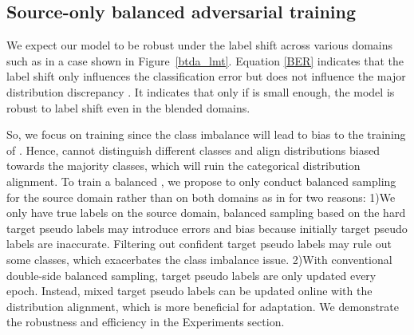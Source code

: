 \documentclass[letterpaper]{article} \usepackage{aaai23}  \usepackage{times}  \usepackage{helvet}  \usepackage{courier}  \usepackage[hyphens]{url}  \usepackage{graphicx} \urlstyle{rm} \def\UrlFont{\rm}  \usepackage{natbib}  \usepackage{caption} \frenchspacing  \setlength{\pdfpagewidth}{8.5in}  \setlength{\pdfpageheight}{11in}
\begin{document}
\subsection{Source-only balanced adversarial training}
We expect our model to be robust under the label shift across various domains such as in a case shown in Figure~\ref{btda_lmt}. Equation \ref{BER} indicates that the label shift only influences the classification error  but does not influence the major distribution discrepancy . It indicates that only if  is small enough, the model is robust to label shift even in the blended domains. 

So, we focus on training  since the class imbalance will lead to bias to the training of . Hence,  cannot distinguish different classes and align distributions biased towards the majority classes, which will ruin the categorical distribution alignment. To train a balanced , we propose to only conduct balanced sampling for the source domain rather than on both domains as in \cite{jiang2020implicit} for two reasons: 1)We only have true labels on the source domain, balanced sampling based on the hard target pseudo labels may introduce errors and bias because initially target pseudo labels are inaccurate. Filtering out confident target pseudo labels may rule out some classes, which exacerbates the class imbalance issue. 2)With conventional double-side balanced sampling, target pseudo labels are only updated every epoch. Instead, mixed target pseudo labels can be updated online with the distribution alignment, which is more beneficial for adaptation. We demonstrate the robustness and efficiency in the Experiments section.
\end{document}
